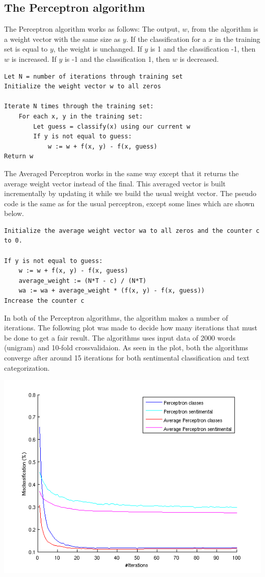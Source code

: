 \subsection{The Perceptron algorithm}
The Perceptron algorithm works as follows:
The output, $w$, from the algorithm is a weight vector with the same size as $y$. If the classification for a $x$ in the training set is equal to $y$, the weight is unchanged.
If $y$ is 1 and the classification -1, then $w$ is increased. If $y$ is -1 and the classification 1, then $w$ is decreased. \citep{perceptron_ai}
\begin{verbatim}
Let N = number of iterations through training set
Initialize the weight vector w to all zeros

Iterate N times through the training set:
    For each x, y in the training set:
        Let guess = classify(x) using our current w
        If y is not equal to guess:
            w := w + f(x, y) - f(x, guess)
Return w
\end{verbatim}
The Averaged Perceptron works in the same way except that it returns the average weight vector instead of the final.
This averaged vector is built incrementally by updating it while we build the usual weight vector. The pseudo code is the same as for the usual perceptron, except some lines which are shown below.
\begin{verbatim}
Initialize the average weight vector wa to all zeros and the counter c to 0.

If y is not equal to guess:
    w := w + f(x, y) - f(x, guess)
    average_weight := (N*T - c) / (N*T)
    wa := wa + average_weight * (f(x, y) - f(x, guess))
Increase the counter c
\end{verbatim}
In both of the Perceptron algorithms, the algorithm makes a number of iterations. The following plot was made to decide how many iterations that must be done to get a fair result. The algorithms uses input data of 2000 words (unigram) and 10-fold crossvalidaion. As seen in the plot, both the algorithms converge after around 15 iterations for both sentimental classification and text categorization.
\begin{center}
\includegraphics[scale = 0.8]{fig/perceptron_2000words_unigram_10foldcv_classes-high_sentimental-low.png}
\end{center}

